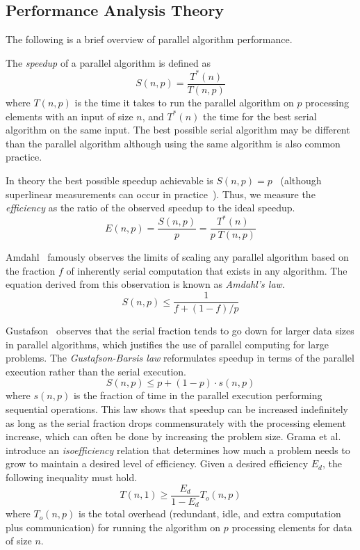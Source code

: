 \documentclass{llncs}
\newcommand*{\lcite}[1]{~\cite{#1}}
\newcommand*{\scite}[1]{~\cite{#1}}
\newcommand{\etal}{et al.\xspace}
\newcommand*{\keyterm}[1]{\emph{#1}}
\begin{document}
\subsection{Performance Analysis Theory}

\noindent
The following is a brief overview of parallel algorithm performance.

The \keyterm{speedup} of a parallel algorithm is defined as
\begin{equation}
  S(n,p) = \frac{T^*(n)}{T(n,p)}
  \label{eq:Speedup}
\end{equation}
where $T(n,p)$ is the time it takes to run the parallel algorithm on $p$
processing elements with an input of size $n$, and $T^*(n)$ the time for the
best serial algorithm on the same input. The best possible serial algorithm
may be different than the parallel algorithm although using the same
algorithm is also common practice.

In theory the best possible speedup achievable is $S(n,p) =
p$\lcite{Faber1986} (although superlinear measurements can occur in
practice\lcite{Gustafson1990}). Thus, we measure the \keyterm{efficiency}
as the ratio of the observed speedup to the ideal speedup.
\begin{equation}
  E(n,p) = \frac{S(n,p)}{p} = \frac{T^*(n)}{p \; T(n,p)}
  \label{eq:Efficiency}
\end{equation}

Amdahl\scite{Amdahl1967} famously observes the limits of scaling any
parallel algorithm based on the fraction $f$ of inherently serial
computation that exists in any algorithm. The equation derived from this
observation is known as \keyterm{Amdahl's law}.
\begin{equation}
  S(n,p) \leq \frac{1}{f + (1-f)/p}
  \label{eq:Amdahl}
\end{equation}

Gustafson\scite{Gustafson1988} observes that the serial fraction tends to
go down for larger data sizes in parallel algorithms, which justifies the
use of parallel computing for large problems. The \keyterm{Gustafson-Barsis
  law} reformulates speedup in terms of the parallel execution rather than
the serial execution.
\begin{equation}
  S(n,p) \leq p + (1-p) \cdot s(n,p)
  \label{eq:GustafsonBarsis}
\end{equation}
where $s(n,p)$ is the fraction of time in the parallel execution performing
sequential operations. This law shows that speedup can be increased
indefinitely as long as the serial fraction drops commensurately with the
processing element increase, which can often be done by increasing the
problem size. Grama \etal\scite{Grama1993} introduce an
\keyterm{isoefficiency} relation that determines how much a problem needs to
grow to maintain a desired level of efficiency. Given a desired efficiency
$E_d$, the following inequality must hold.
\begin{equation}
  T(n,1) \geq \frac{E_d}{1-E_d} T_o(n,p)
  \label{eq:Isoefficiency}
\end{equation}
where $T_o(n,p)$ is the total overhead (redundant, idle, and extra
computation plus communication) for running the algorithm on $p$ processing
elements for data of size $n$.
\end{document}
